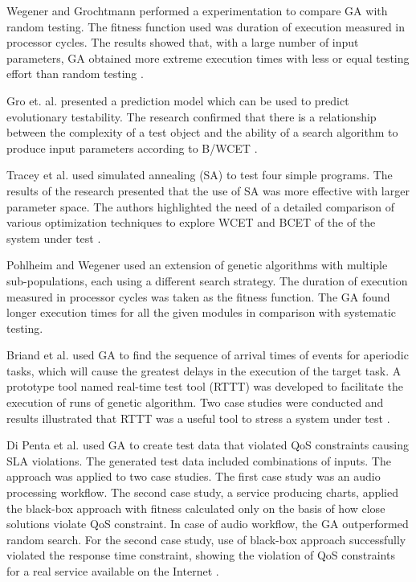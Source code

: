 \documentclass[times]{stvrauth}
\begin{document}
Wegener and Grochtmann performed a  experimentation
to compare GA with random testing. The fitness function used was duration of execution measured in processor cycles.  The results showed that, with a large number of input parameters, GA obtained more extreme execution times with less or equal testing effort than random testing \cite{J.WegenerK.GrimmM.GrochtmannH.Sthamer1996} \cite{Wegener1998} .

Gro et. al. \cite{Gross2000} presented a prediction model  which can be used to predict evolutionary testability. The research confirmed that there is a relationship between the complexity of a test object and the ability of a search algorithm to produce input parameters according to B/WCET \cite{Gross2000}. 

Tracey et al. \cite{Tracey1998} used simulated annealing (SA) to test four
simple programs. The results of the research presented that the use of SA was more effective with larger parameter space. The authors highlighted the need of a detailed comparison of various optimization techniques to explore WCET and BCET of the of the system under test \cite{Tracey1998}.

Pohlheim and Wegener used an extension of genetic algorithms with multiple sub-populations, each using a different search strategy. The duration of execution measured in processor cycles was taken as the fitness
function. The GA found longer execution times for all the given modules in comparison with systematic testing\cite{Pohlheim2005}.

Briand et al. \cite{Briand2005} used GA to find the sequence of arrival times of events for aperiodic tasks, which will cause the greatest delays in the execution of the target task. A prototype tool named real-time test tool (RTTT) was developed to facilitate the execution of runs of genetic algorithm. Two case studies were conducted and results illustrated that RTTT was a useful tool to stress a system under test \cite{Briand2005}.

Di Penta et al. \cite{Penta2007} used GA to create test data that violated QoS constraints causing SLA violations. The generated test data included combinations of inputs. The approach was applied to two case studies. The first case study was an audio processing workflow. The second case study, a service producing charts, applied the black-box approach with fitness calculated only on the basis of how close solutions violate QoS constraint. In case of audio workflow, the GA outperformed random search. For the second case study, use of black-box approach successfully violated the response time constraint, showing the violation of QoS constraints for a real service available on the Internet \cite{Penta2007}.
\end{document}
